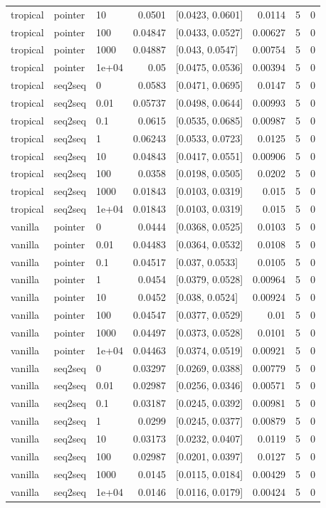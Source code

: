 \documentclass[10pt]{article}
\begin{document}
{\begin{longtable}{lllrlrrr}
tropical & pointer & 10 & 0.0501 & [0.0423, 0.0601] & 0.0114 & 5 & 0\\
tropical & pointer & 100 & 0.04847 & [0.0433, 0.0527] & 0.00627 & 5 & 0\\
tropical & pointer & 1000 & 0.04887 & [0.043, 0.0547] & 0.00754 & 5 & 0\\
tropical & pointer & 1e+04 & 0.05 & [0.0475, 0.0536] & 0.00394 & 5 & 0\\
tropical & seq2seq & 0 & 0.0583 & [0.0471, 0.0695] & 0.0147 & 5 & 0\\
tropical & seq2seq & 0.01 & 0.05737 & [0.0498, 0.0644] & 0.00993 & 5 & 0\\
tropical & seq2seq & 0.1 & 0.0615 & [0.0535, 0.0685] & 0.00987 & 5 & 0\\
tropical & seq2seq & 1 & 0.06243 & [0.0533, 0.0723] & 0.0125 & 5 & 0\\
tropical & seq2seq & 10 & 0.04843 & [0.0417, 0.0551] & 0.00906 & 5 & 0\\
tropical & seq2seq & 100 & 0.0358 & [0.0198, 0.0505] & 0.0202 & 5 & 0\\
tropical & seq2seq & 1000 & 0.01843 & [0.0103, 0.0319] & 0.015 & 5 & 0\\
tropical & seq2seq & 1e+04 & 0.01843 & [0.0103, 0.0319] & 0.015 & 5 & 0\\
vanilla & pointer & 0 & 0.0444 & [0.0368, 0.0525] & 0.0103 & 5 & 0\\
vanilla & pointer & 0.01 & 0.04483 & [0.0364, 0.0532] & 0.0108 & 5 & 0\\
vanilla & pointer & 0.1 & 0.04517 & [0.037, 0.0533] & 0.0105 & 5 & 0\\
vanilla & pointer & 1 & 0.0454 & [0.0379, 0.0528] & 0.00964 & 5 & 0\\
vanilla & pointer & 10 & 0.0452 & [0.038, 0.0524] & 0.00924 & 5 & 0\\
vanilla & pointer & 100 & 0.04547 & [0.0377, 0.0529] & 0.01 & 5 & 0\\
vanilla & pointer & 1000 & 0.04497 & [0.0373, 0.0528] & 0.0101 & 5 & 0\\
vanilla & pointer & 1e+04 & 0.04463 & [0.0374, 0.0519] & 0.00921 & 5 & 0\\
vanilla & seq2seq & 0 & 0.03297 & [0.0269, 0.0388] & 0.00779 & 5 & 0\\
vanilla & seq2seq & 0.01 & 0.02987 & [0.0256, 0.0346] & 0.00571 & 5 & 0\\
vanilla & seq2seq & 0.1 & 0.03187 & [0.0245, 0.0392] & 0.00981 & 5 & 0\\
vanilla & seq2seq & 1 & 0.0299 & [0.0245, 0.0377] & 0.00879 & 5 & 0\\
vanilla & seq2seq & 10 & 0.03173 & [0.0232, 0.0407] & 0.0119 & 5 & 0\\
vanilla & seq2seq & 100 & 0.02987 & [0.0201, 0.0397] & 0.0127 & 5 & 0\\
vanilla & seq2seq & 1000 & 0.0145 & [0.0115, 0.0184] & 0.00429 & 5 & 0\\
vanilla & seq2seq & 1e+04 & 0.0146 & [0.0116, 0.0179] & 0.00424 & 5 & 0\\
\bottomrule
\end{longtable}
}
\end{document}
